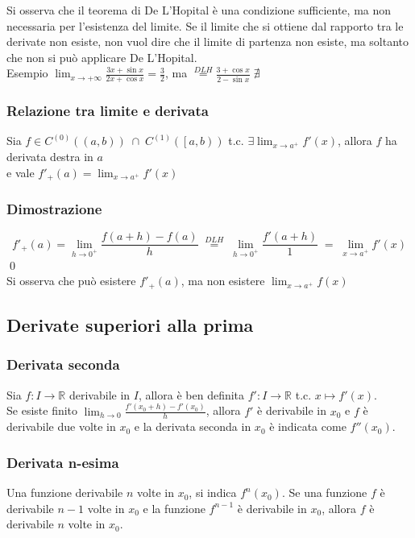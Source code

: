 \documentclass[a4paper]{article}
\newcommand\cont[2]{C^{(#1)} \left({#2}\right)}
\begin{document}
Si osserva che il teorema di De L'Hopital è una condizione sufficiente, ma non necessaria per l'esistenza del limite. Se il limite che si ottiene dal rapporto
tra le derivate non esiste, non vuol dire che il limite di partenza non esiste, ma soltanto che non si può applicare De L'Hopital. \\
Esempio \(\displaystyle \lim_{x \to + \infty} \frac{3x + \sin x}{2x + \cos x} = \frac{3}{2}\), ma \(\displaystyle \stackrel{DLH}{=} \frac{3 + \cos x}{2 - \sin x} \; \nexists\)

\newpage

\subsubsection*{Relazione tra limite e derivata}
Sia \(f \in \cont{0}{\left(a, b\right)} \; \cap \; \cont{1}{\left[a, b\right)}\) t.c. \(\displaystyle \exists \lim_{x \to a^+} f'(x)\), allora \(f\) ha derivata destra in \(a\) \\
e vale \(\displaystyle f'_+(a) = \lim_{x \to a^+} f'(x)\)

\subsubsection*{Dimostrazione}
\[f'_+(a) = \lim_{h \to 0^+} \frac{f(a + h) - f(a)}{h} \; \stackrel{DLH}{=} \; \lim_{h \to 0^+} \frac{f'(a + h)}{1} \; = \; \lim_{x \to a^+} f'(x)\]
\qed \\
Si osserva che può esistere \(f'_+(a)\), ma non esistere \(\displaystyle \lim_{x \to a^+} f(x)\)

\subsection{Derivate superiori alla prima}
\subsubsection*{Derivata seconda}
Sia \(f:I \to \mathbb{R}\) derivabile in \(I\), allora è ben definita \(f':I \to \mathbb{R}\) t.c. \(x \mapsto f'(x)\). \\
Se esiste finito \(\displaystyle \lim_{h \to 0} \frac{f'(x_0 + h) - f'(x_0)}{h}\), allora \(f'\) è derivabile in \(x_0\)
e \(f\) è derivabile due volte in \(x_0\) e la derivata seconda in \(x_0\) è indicata come \(f''(x_0)\).

\subsubsection*{Derivata n-esima}
Una funzione derivabile \(n\) volte in \(x_0\), si indica \(f^n(x_0)\). Se una funzione \(f\) è derivabile \(n-1\) volte in \(x_0\)
e la funzione \(f^{n-1}\) è derivabile in \(x_0\), allora \(f\) è derivabile \(n\) volte in \(x_0\).
\end{document}
